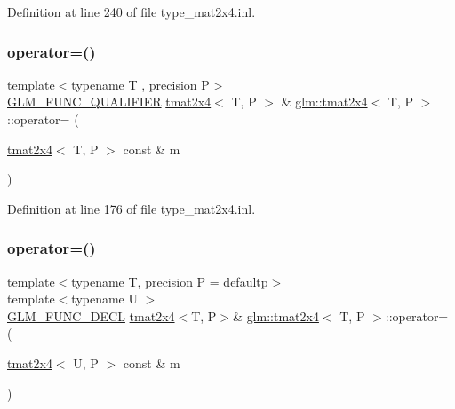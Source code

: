 Definition at line 240 of file type\+\_\+mat2x4.\+inl.

\mbox{\label{structglm_1_1tmat2x4_a6b28f8306b71c409138050173a41dc7e}} 
\subsubsection{\texorpdfstring{operator=()}{operator=()}\hspace{0.1cm}{\footnotesize\ttfamily [1/3]}}
{\footnotesize\ttfamily template$<$typename T , precision P$>$ \\
\mbox{\hyperlink{setup_8hpp_a33fdea6f91c5f834105f7415e2a64407}{G\+L\+M\+\_\+\+F\+U\+N\+C\+\_\+\+Q\+U\+A\+L\+I\+F\+I\+ER}} \mbox{\hyperlink{structglm_1_1tmat2x4}{tmat2x4}}$<$ T, P $>$ \& \mbox{\hyperlink{structglm_1_1tmat2x4}{glm\+::tmat2x4}}$<$ T, P $>$\+::operator= (\begin{DoxyParamCaption}\item[{\mbox{\hyperlink{structglm_1_1tmat2x4}{tmat2x4}}$<$ T, P $>$ const \&}]{m }\end{DoxyParamCaption})}



Definition at line 176 of file type\+\_\+mat2x4.\+inl.

\mbox{\label{structglm_1_1tmat2x4_abec672d9eb6e8a3a6bdb0ffe46b1f3c7}} 
\subsubsection{\texorpdfstring{operator=()}{operator=()}\hspace{0.1cm}{\footnotesize\ttfamily [2/3]}}
{\footnotesize\ttfamily template$<$typename T, precision P = defaultp$>$ \\
template$<$typename U $>$ \\
\mbox{\hyperlink{setup_8hpp_ab2d052de21a70539923e9bcbf6e83a51}{G\+L\+M\+\_\+\+F\+U\+N\+C\+\_\+\+D\+E\+CL}} \mbox{\hyperlink{structglm_1_1tmat2x4}{tmat2x4}}$<$T, P$>$\& \mbox{\hyperlink{structglm_1_1tmat2x4}{glm\+::tmat2x4}}$<$ T, P $>$\+::operator= (\begin{DoxyParamCaption}\item[{\mbox{\hyperlink{structglm_1_1tmat2x4}{tmat2x4}}$<$ U, P $>$ const \&}]{m }\end{DoxyParamCaption})}

